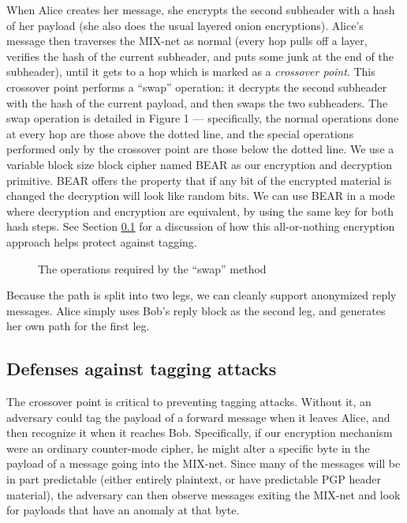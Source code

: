 \documentclass{llncs}
\begin{document}
When Alice creates her message, she encrypts the second subheader
with a hash of her payload (she also does the usual layered onion
encryptions). Alice's message then traverses the MIX-net as normal (every
hop pulls off a layer, verifies the hash of the current subheader,
and puts some junk at the end of the subheader), until it gets to a
hop which is marked as a \emph{crossover point}. This crossover point
performs a ``swap'' operation: it decrypts the second subheader with
the hash of the current payload, and then swaps the two subheaders. The
swap operation is detailed in Figure 1 --- specifically, the normal
operations done at every hop are those above the dotted line, and the
special operations performed only by the crossover point are those below
the dotted line.  We use a variable block size block cipher named BEAR
\cite{BEAR} as our encryption and decryption primitive. BEAR offers
the property that if any bit of the encrypted material is changed the
decryption will look like random bits. We can use BEAR in a mode where
decryption and encryption are equivalent, by using the same key for
both hash steps. See Section \ref{subsec:tagging} for a discussion of
how this all-or-nothing encryption approach helps protect against tagging.

\begin{figure}
\begin{center}
\caption{The operations required by the ``swap'' method} 
\end{center}
\end{figure}

Because the path is split into two legs, we can cleanly support anonymized
reply messages. Alice simply uses Bob's reply block as the second leg,
and generates her own path for the first leg.

\subsection{Defenses against tagging attacks}
\label{subsec:tagging}


The crossover point is critical to preventing tagging attacks. Without
it, an adversary could tag the payload of a forward message when it
leaves Alice, and then recognize it when it reaches Bob. Specifically,
if our encryption mechanism were an ordinary counter-mode cipher, he
might alter a specific byte in the payload of a message going into the
MIX-net. Since many of the messages will be in part predictable
(either entirely plaintext, or have predictable PGP header material),
the adversary can then observe messages exiting the MIX-net and
look for payloads that have an anomaly at that byte.
\end{document}
